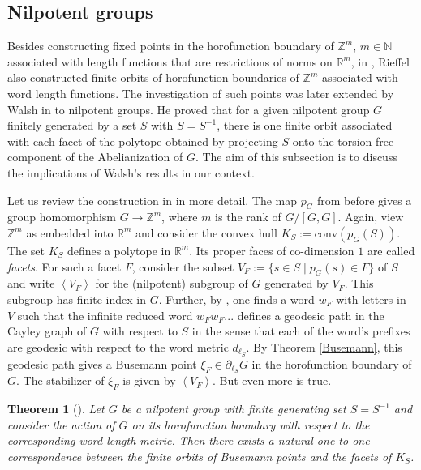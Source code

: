 \documentclass[a4paper,11pt,reqno]{amsart}
\numberwithin{equation}{section}
\numberwithin{equation}{section}
\newtheorem{theorem}{Theorem}[section]
\theoremstyle{definition}
\theoremstyle{remark}
\theoremstyle{remark}
\begin{document}
\vspace{3mm}



\subsection{Nilpotent groups}

Besides constructing fixed points in the horofunction boundary
of $\mathbb{Z}^{m}$, $m\in\mathbb{N}$ associated with length functions
that are restrictions of norms on $\mathbb{R}^{m}$, in \cite[Section 8]{Rieffel02},
Rieffel also constructed finite orbits of horofunction boundaries
of $\mathbb{Z}^{m}$ associated with word length functions. The investigation
of such points was later extended by Walsh in \cite{Walsh07} to nilpotent
groups. He proved that for a given nilpotent group $G$ finitely generated
by a set $S$ with $S=S^{-1}$, there is one finite orbit associated
with each facet of the polytope obtained by projecting $S$ onto the
torsion-free component of the Abelianization of $G$. The aim of this
subsection is to discuss the implications of Walsh's results in our context.

Let us review the construction in \cite{Walsh07} in more detail. The map $p_{G}$
from before gives a group homomorphism $G\rightarrow\mathbb{Z}^{m}$,
where $m$ is the rank of $G/[G,G]$. Again, view $\mathbb{Z}^{m}$
as embedded into $\mathbb{R}^{m}$ and consider the convex hull $K_{S}:=\text{conv}(p_{G}(S))$.
The set $K_{S}$ defines a polytope in $\mathbb{R}^{m}$. Its proper
faces of co-dimension $1$ are called \emph{facets}. For such a facet
$F$, consider the subset $V_{F}:=\{s\in S\mid p_{G}(s)\in F\}$ of
$S$ and write $\left\langle V_{F}\right\rangle $ for the (nilpotent)
subgroup of $G$ generated by $V_{F}$. This subgroup has finite index
in $G$. Further, by \cite[Section 4]{Walsh07}, one finds a word $w_{F}$
with letters in $V$ such that the infinite reduced word $w_{F}w_{F}...$
defines a geodesic path in the Cayley graph of $G$ with respect to
$S$ in the sense that each of the word's prefixes are geodesic with
respect to the word metric $d_{\ell_S}$. By Theorem \ref{Busemann}, this geodesic
path gives a Busemann point $\xi_{F}\in\partial_{\ell_{S}}G$ in the
horofunction boundary of $G$. The stabilizer of $\xi_{F}$ is given
by $\left\langle V_{F}\right\rangle $. But even more is true.

\begin{theorem}[{\cite[Theorem 1.1]{Walsh07}}] Let $G$ be a nilpotent
group with finite generating set $S=S^{-1}$ and consider the action
of $G$ on its horofunction boundary with respect to the corresponding
word length metric. Then there exists a natural one-to-one correspondence
between the finite orbits of Busemann points and the facets of $K_{S}$.
\end{theorem}
\end{document}
